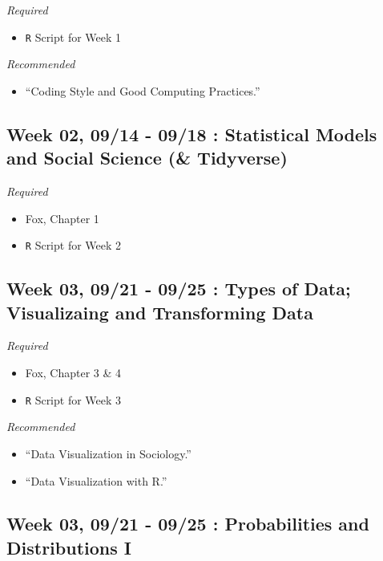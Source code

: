 \documentclass[11pt,]{article}
\providecommand{\tightlist}{%
  \setlength{\itemsep}{0pt}\setlength{\parskip}{0pt}}
\begin{document}
\emph{Required}

\begin{itemize}
\tightlist
\item
  \texttt{R} Script for Week 1
\end{itemize}

\emph{Recommended}

\begin{itemize}
\tightlist
\item
  ``Coding Style and Good Computing Practices.''
\end{itemize}

\hypertarget{week-02-0914---0918-statistical-models-and-social-science-tidyverse}{%
\subsection{Week 02, 09/14 - 09/18 : Statistical Models and Social
Science (\&
Tidyverse)}\label{week-02-0914---0918-statistical-models-and-social-science-tidyverse}}

\emph{Required}

\begin{itemize}
\item
  Fox, Chapter 1
\item
  \texttt{R} Script for Week 2
\end{itemize}

\hypertarget{week-03-0921---0925-types-of-data-visualizaing-and-transforming-data}{%
\subsection{Week 03, 09/21 - 09/25 : Types of Data; Visualizaing and
Transforming
Data}\label{week-03-0921---0925-types-of-data-visualizaing-and-transforming-data}}

\emph{Required}

\begin{itemize}
\item
  Fox, Chapter 3 \& 4
\item
  \texttt{R} Script for Week 3
\end{itemize}

\emph{Recommended}

\begin{itemize}
\item
  ``Data Visualization in Sociology.''
\item
  ``Data Visualization with R.''
\end{itemize}

\hypertarget{week-03-0921---0925-probabilities-and-distributions-i}{%
\subsection{Week 03, 09/21 - 09/25 : Probabilities and Distributions
I}\label{week-03-0921---0925-probabilities-and-distributions-i}}
\end{document}
